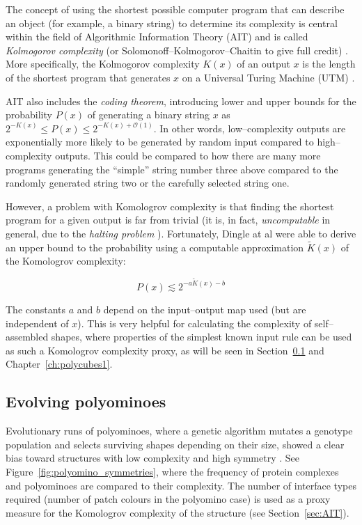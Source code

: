 The concept of using the shortest possible computer program that can describe an object (for example, a binary string) to determine its complexity is central within the field of Algorithmic Information Theory (AIT) and is called \emph{Kolmogorov complexity} (or Solomonoff–Kolmogorov–Chaitin to give full credit) \cite{LiMing2019AitK}. More specifically, the Kolmogorov complexity \(K(x)\) of an output \(x\) is the length of the shortest program that generates \(x\) on a Universal Turing Machine (UTM) \cite{LiMing2019AitK}.

AIT also includes the \emph{coding theorem}, introducing lower and upper bounds for the probability \(P(x)\) of generating a binary string \(x\) as \(2^{-K(x)} \le P(x) \le 2^{-K(x) + \mathcal{O} (1)}\). In other words, low--complexity outputs are exponentially more likely to be generated by random input compared to high--complexity outputs. This could be compared to how there are many more programs generating the ``simple'' string number three above compared to the randomly generated string two or the carefully selected string one.

However, a problem with Komologrov complexity is that finding the shortest program for a given output is far from trivial (it is, in fact, \emph{uncomputable} in general, due to the \emph{halting problem} \cite{LiMing2019AitK}). Fortunately, Dingle at al \cite{dingle2018input} were able to derive an upper bound to the probability using a computable approximation \(\widetilde{K}(x)\) of the Komologrov complexity:

\[
  P(x) \lesssim 2^{-a\widetilde{K}(x) -b}
\]

The constants \(a\) and \(b\) depend on the input--output map used (but are independent of \(x\)). This is very helpful for calculating the complexity of self--assembled shapes, where properties of the simplest known input rule can be used as such a Komologrov complexity proxy, as will be seen in Section~\ref{sec:polyomino_evolve} and Chapter~\ref{ch:polycubes1}.

\subsection{Evolving polyominoes}
\label{sec:polyomino_evolve}

Evolutionary runs of polyominoes, where a genetic algorithm mutates a genotype population and selects surviving shapes depending on their size, showed a clear bias toward structures with low complexity and high symmetry \cite{johnston2021}. See Figure~\ref{fig:polyomino_symmetries}, where the frequency of protein complexes and polyominoes are compared to their complexity. The number of interface types required (number of patch colours in the polyomino case) is used as a proxy measure for the Komologrov complexity of the structure (see Section~\ref{sec:AIT}).

